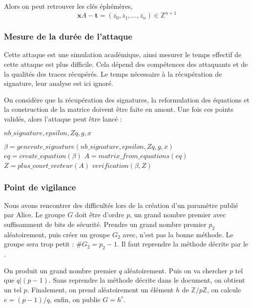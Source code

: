 \documentclass{backend}
\begin{document}
Alors on peut retrouver les clés éphémères,
$$
\mathbf{x} A-\mathbf{t}=\left(z_{0}, z_{1}, \ldots, z_{n}\right) \in \mathbb{Z}^{n+1}
$$

\subsubsection{Mesure de la durée de l'attaque}

Cette attaque est une simulation académique, ainsi mesurer le temps effectif de cette attaque est plus difficile. Cela dépend des compétences des attaquants et de la qualités des traces récupérés. Le temps nécessaire à la récupération de signature, leur analyse est ici ignoré.


On considère que la récupération des signatures, la reformulation des équations et la construction de la matrice doivent être faite en amont. Une fois ces points validés, alors l'attaque peut être lancé :

\begin{algorithm}
\caption{}
\begin{algorithmic}
\Require $nb\_signature, epsilon, Zq, g, x$  

\State $\beta = generate\_signature(nb\_signature, epsilon, Zq, g, x)$
\State $eq = create\_equation(\beta)$
\State $A = matrix\_from\_equations(eq)$
\State $Z = plus\_court\_vecteur(A)$
\State $verification(\beta, Z)$
\end{algorithmic}
\end{algorithm}

\subsubsection{Point de vigilance}

Nous avons rencontrer des difficultés lors de la création d'un paramètre publié par Alice. Le groupe $G$ doit être d'ordre $p$, un grand nombre premier avec suffisamment de bits de sécurité. Prendre un grand nombre premier $p_2$ aléatoirement, puis créer un groupe $G_2$ avec, n'est pas la bonne méthode. Le groupe sera trop petit : $\#G_2 = p_2 - 1$. Il faut reprendre la méthode décrite par le  \cite{dsaFIPS}.

On produit un grand nombre premier $q$ aléatoirement. Puis on va chercher $p$ tel que $q | (p-1)$. Sans reprendre la méthode décrite dans le document, on obtient un tel $p$. Finalement, on prend aléatoirement un élément $h$ de $\mathbb{Z} / p \mathbb{Z}$, on calcule $e = (p - 1) / q$, enfin, on publie $G = h^e$.
\end{document}
